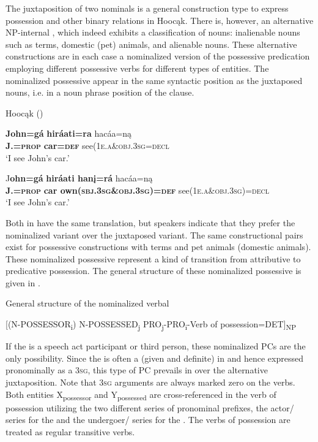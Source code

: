 \documentclass[output=paper]{LSP/langsci}
\begin{document}
The juxtaposition of two nominals is a general construction type to express possession and other binary relations in Hoocąk. There is, however, an alternative NP-internal , which indeed exhibits a classification of nouns: inalienable nouns such as  terms, domestic (pet) animals, and alienable nouns. These alternative constructions are in each case a nominalized version of the possessive predication employing different possessive verbs for different types of  entities. The nominalized possessive  appear in the same syntactic position as the juxtaposed nouns, i.e. in a noun phrase position of the clause. 
 

\ea {}Hoocąk (\citealt[16]{Helmbrecht2003}) \label{seecar}

\ea 
\gll \textbf{John=g\'a} \textbf{hir\'aati=ra}  hac\'aa=n\k{a} \\
\textbf{J.=\textsc{prop}} \textbf{car=\textsc{def}} see(\textsc{1e.a}\&\textsc{obj.3sg}=\textsc{decl} \\
\glt `I see John's car.'  

\ex 
\gll J\textbf{ohn=g\'a} \textbf{hir\'aati han\k{i}=r\'a} hac\'aa=n\k{a}  \\
\textbf{J.=\textsc{prop}} \textbf{car own(\textsc{sbj.3sg}\&\textsc{obj.3sg})=\textsc{def}} see(\textsc{1e.a}\&\textsc{obj.3sg})=\textsc{decl}  \\
\glt `I see John's car.'
\z
\z 

Both  in  have the same translation, but speakers indicate that they prefer the nominalized variant over the juxtaposed variant. The same constructional pairs exist for possessive constructions with  terms and pet animals (domestic animals). These nominalized possessive  represent a kind of transition from attributive to predicative possession. The general structure of these nominalized possessive  is given in .

\ea General structure of the nominalized verbal  \label{generalstructure}

[(N-POSSESSOR\textsubscript{i})  N-POSSESSED\textsubscript{j}    PRO\textsubscript{j}-PRO\textsubscript{i}-Verb of possession=DET]\textsubscript{NP}
\z

If the  is a speech act participant or third person, these nominalized PCs are the only possibility. Since the  is often a  (given and definite) in  and hence expressed pronominally as a \textsc{3sg}, this type of PC prevails in  over the alternative juxtaposition. Note that \textsc{3sg} arguments are always marked zero on the verbs. Both entities X\textsubscript{possessor} and Y\textsubscript{possessed} are cross-referenced in the verb of possession utilizing the two different series of pronominal prefixes, the actor/ series for the  and the undergoer/ series for the . The verbs of possession are treated as regular transitive verbs.
\end{document}
